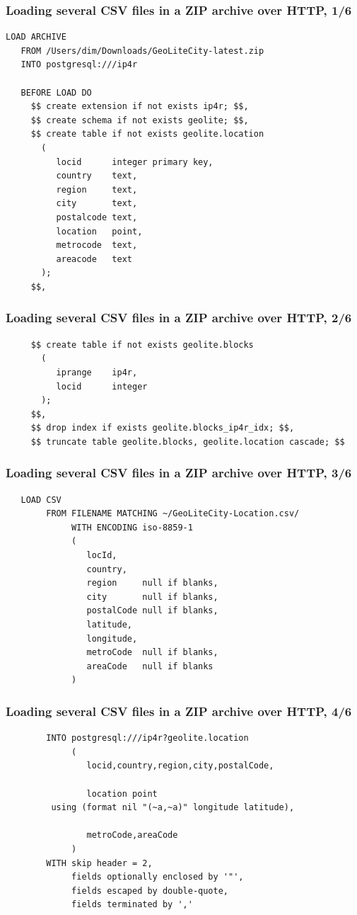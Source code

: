 \documentclass{beamer}
\begin{document}
\begin{frame}[fragile]
  \frametitle{Loading several CSV files in a ZIP archive over HTTP, 1/6}
  
\begin{verbatim}
LOAD ARCHIVE
   FROM /Users/dim/Downloads/GeoLiteCity-latest.zip
   INTO postgresql:///ip4r

   BEFORE LOAD DO
     $$ create extension if not exists ip4r; $$,
     $$ create schema if not exists geolite; $$,
     $$ create table if not exists geolite.location
       (
          locid      integer primary key,
          country    text,
          region     text,
          city       text,
          postalcode text,
          location   point,
          metrocode  text,
          areacode   text
       );
     $$,
\end{verbatim}
\end{frame}
\begin{frame}[fragile]
  \frametitle{Loading several CSV files in a ZIP archive over HTTP, 2/6}
  
\begin{verbatim}
     $$ create table if not exists geolite.blocks
       (
          iprange    ip4r,
          locid      integer
       );
     $$,
     $$ drop index if exists geolite.blocks_ip4r_idx; $$,
     $$ truncate table geolite.blocks, geolite.location cascade; $$
\end{verbatim}
\end{frame}

\begin{frame}[fragile]
  \frametitle{Loading several CSV files in a ZIP archive over HTTP, 3/6}
  
\begin{verbatim}
   LOAD CSV
        FROM FILENAME MATCHING ~/GeoLiteCity-Location.csv/
             WITH ENCODING iso-8859-1
             (
                locId,
                country,
                region     null if blanks,
                city       null if blanks,
                postalCode null if blanks,
                latitude,
                longitude,
                metroCode  null if blanks,
                areaCode   null if blanks
             )
\end{verbatim}
\end{frame}

\begin{frame}[fragile]
  \frametitle{Loading several CSV files in a ZIP archive over HTTP, 4/6}
  
\begin{verbatim}
        INTO postgresql:///ip4r?geolite.location
             (
                locid,country,region,city,postalCode,

                location point
         using (format nil "(~a,~a)" longitude latitude),

                metroCode,areaCode
             )
        WITH skip header = 2,
             fields optionally enclosed by '"',
             fields escaped by double-quote,
             fields terminated by ','
\end{verbatim}
\end{frame}
\end{document}
